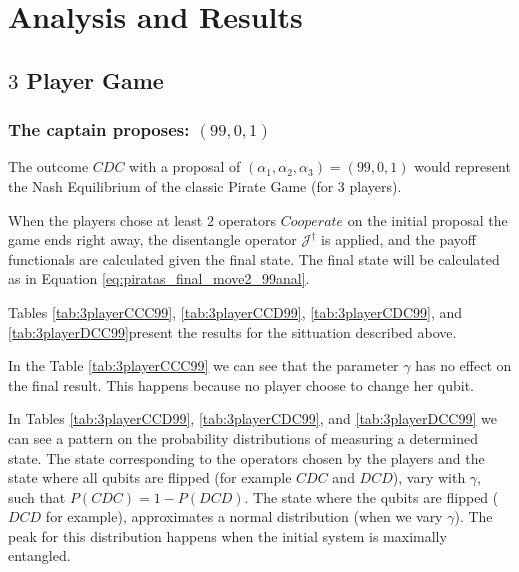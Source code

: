 \section{Analysis and Results}
\label{sec:description_3}


\subsection{$3$ Player Game}
\label{subsec:3playergame}

\subsubsection{The captain proposes: $(99, 0, 1)$}
\label{subsubsec:3playergame99}

The outcome $CDC$ with a proposal of $(\alpha_{1}, \alpha_{2}, \alpha_{3}) =(99, 0, 1)$ would represent the Nash Equilibrium of the classic Pirate Game (for $3$ players). 

When the players chose at least $2$ operators $Cooperate$ on the initial proposal the game ends right away, the disentangle operator $\mathcal{J}^{\dagger}$ is applied, and the payoff functionals are calculated given the final state. The final state will be calculated as in Equation \ref{eq:piratas_final_move2_99anal}. 

Tables \ref{tab:3playerCCC99}, \ref{tab:3playerCCD99}, \ref{tab:3playerCDC99}, and \ref{tab:3playerDCC99}present the results for the sittuation described above.

In the Table \ref{tab:3playerCCC99} we can see that the parameter $\gamma$ has no effect on the final result. This happens because no player choose to change her qubit. 

In Tables \ref{tab:3playerCCD99}, \ref{tab:3playerCDC99}, and \ref{tab:3playerDCC99} we can see a pattern on the probability distributions of measuring a determined state. The state corresponding to the operators chosen by the players and the state where all qubits are flipped (for example $CDC$ and $DCD$), vary with $\gamma$, such that $P(CDC)= 1 - P(DCD)$. The state where the qubits are flipped ($DCD$ for example), approximates a normal distribution (when we vary $\gamma$). The peak for this distribution happens when the initial system is maximally entangled.


